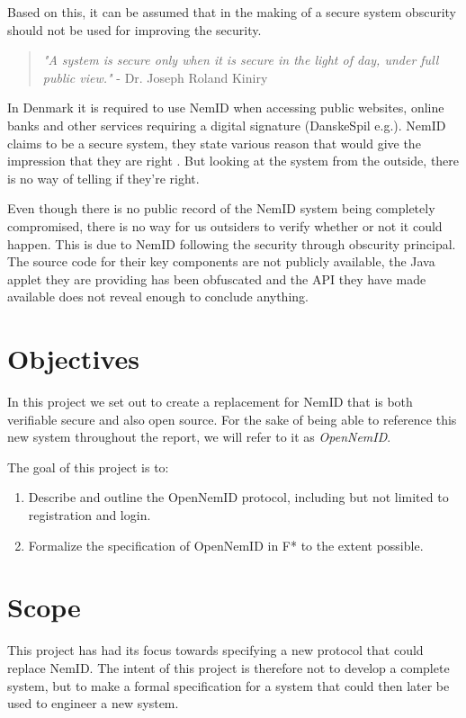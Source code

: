 \documentclass[twosided]{report}
\begin{document}
Based on this, it can be assumed that in the making of a secure system obscurity should not be used for improving the security.
\begin{quote}
\textit{"A system is secure only when it is secure in the light of day, under full public view."} - Dr. Joseph Roland Kiniry \cite{ftspeech}
\end{quote}
\par
In Denmark it is required to use NemID when accessing public websites, online banks and other services requiring a digital signature (DanskeSpil e.g.). NemID claims to be a secure system, they state various reason that would give the impression that they are right \cite{omnemidsikkerhed}. But looking at the system from the outside, there is no way of telling if they're right.
\par
Even though there is no public record of the NemID system being completely compromised, there is no way for us outsiders to verify whether or not it could happen. This is due to NemID following the security through obscurity principal. The source code for their key components are not publicly available, the Java applet they are providing has been obfuscated and the API they have made available does not reveal enough to conclude anything.

\newpage
\section{Objectives}
In this project we set out to create a replacement for NemID that is both verifiable secure and also open source. For the sake of being able to reference this new system throughout the report, we will refer to it as \emph{OpenNemID}.
\\
\par
The goal of this project is to:
\begin{enumerate}
	\item Describe and outline the OpenNemID protocol, including but not limited to registration and login.
	\item Formalize the specification of OpenNemID in F* to the extent possible.
\end{enumerate}

\section{Scope}
This project has had its focus towards specifying a new protocol that could replace NemID. The intent of this project is therefore not to develop a complete system, but to make a formal specification for a system that could then later be used to engineer a new system.
\end{document}
